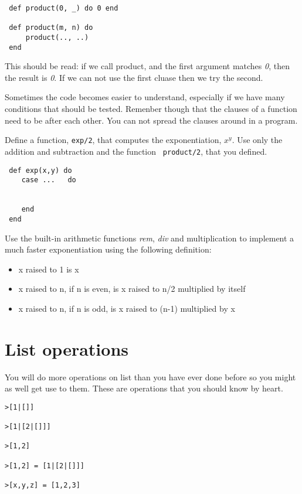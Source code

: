 \documentclass[a4paper,11pt]{article}
\begin{document}
{\begin{verbatim}
 def product(0, _) do 0 end

 def product(m, n) do 
     product(.., ..)
 end
\end{verbatim}

This should be read: if we call product, and the first argument
matches {\em 0}, then the result is {\em 0}. If we can not use the
first cluase then we try the second.

Sometimes the code becomes easier to understand, especially if we have
many conditions that should be tested. Remenber though that the
clauses of a function need to be after each other. You can not spread
the clauses around in a program.


Define a function, {\tt exp/2}, that computes the exponentiation,
$x^y$. Use only the addition and subtraction and the function {\tt
  product/2}, that you defined.

\begin{verbatim}
 def exp(x,y) do 
    case ...   do

 
    end
 end
\end{verbatim}

Use the built-in arithmetic functions {\em rem}, {\em div} and
multiplication {\em *} to implement a much faster exponentiation using
the following definition:

\begin{itemize}
  \item x raised to 1 is x
  \item x raised to n, if n is even, is x raised to n/2 multiplied by itself
  \item x raised to n, if n is odd, is x raised to (n-1) multiplied by x
\end{itemize}


\section{List operations}

You will do more operations on list than you have ever done before so
you might as well get use to them. These are operations that you should
know by heart.

\begin{verbatim}
>[1|[]]

>[1|[2|[]]]

>[1,2]

>[1,2] = [1|[2|[]]]

>[x,y,z] = [1,2,3]


\end{verbatim}}
\end{document}
